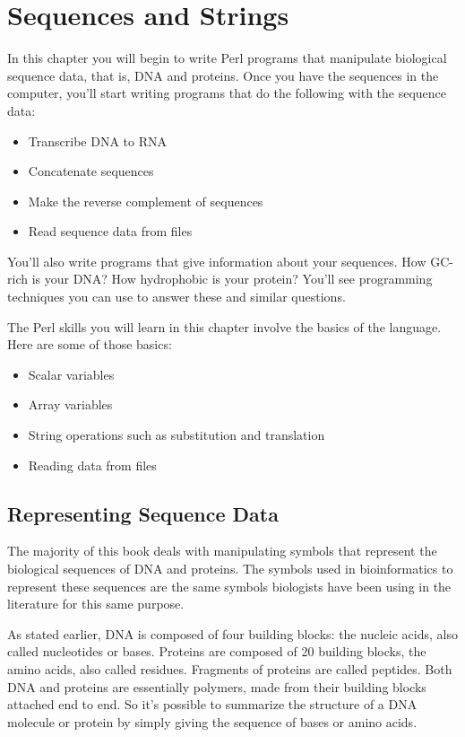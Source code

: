 \chapter{Sequences and Strings}
\label{chap:chapter4}
\minitoc

\setcounter{lstlisting}{5}

In this chapter you will begin to write Perl programs that manipulate biological sequence data, that is, DNA and proteins. Once you have the sequences in the computer, you'll start writing programs that do the following with the sequence data:

\begin{itemize}
  \item Transcribe DNA to RNA
  \item Concatenate sequences
  \item Make the reverse complement of sequences
  \item Read sequence data from files
\end{itemize}

You'll also write programs that give information about your sequences. How GC-rich is your DNA? How hydrophobic is your protein? You'll see programming techniques you can use to answer these and similar questions.

The Perl skills you will learn in this chapter involve the basics of the language. Here are some of those basics:

\begin{itemize}
  \item Scalar variables
  \item Array variables
  \item String operations such as substitution and translation
  \item Reading data from files
\end{itemize}

\section{Representing Sequence Data}
The majority of this book deals with manipulating symbols that represent the biological sequences of DNA and proteins. The symbols used in bioinformatics to represent these sequences are the same symbols biologists have been using in the literature for this same purpose.

As stated earlier, DNA is composed of four building blocks: the nucleic acids, also called nucleotides or bases. Proteins are composed of 20 building blocks, the amino acids, also called residues. Fragments of proteins are called peptides. Both DNA and proteins are essentially polymers, made from their building blocks attached end to end. So it's possible to summarize the structure of a DNA molecule or protein by simply giving the sequence of bases or amino acids.

